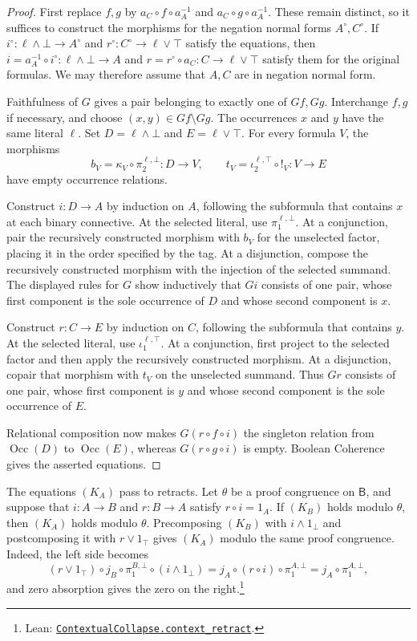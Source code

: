 \documentclass[11pt]{article}
\newcommand{\B}{\mathsf B}
\newcommand{\Occ}{\operatorname{Occ}}
\begin{document}
\begin{proof}
First replace $f,g$ by $a_C\circ f\circ a_A^{-1}$ and
$a_C\circ g\circ a_A^{-1}$. These remain distinct, so it suffices to
construct the morphisms for the negation normal forms $A^\circ,C^\circ$.
If
$i^\circ:\ell\wedge\bot\to A^\circ$ and
$r^\circ:C^\circ\to\ell\vee\top$ satisfy the equations,
then $i=a_A^{-1}\circ i^\circ:\ell\wedge\bot\to A$ and
$r=r^\circ\circ a_C:C\to\ell\vee\top$ satisfy them for the original
formulas.
We may therefore assume that $A,C$ are in negation normal form.

Faithfulness of $G$ gives a pair belonging to exactly one of $Gf,Gg$.
Interchange $f,g$ if necessary, and choose
$(x,y)\in Gf\setminus Gg$. The occurrences $x$ and $y$ have the same
literal $\ell$. Set $D=\ell\wedge\bot$ and $E=\ell\vee\top$.
For every formula $V$, the morphisms
\[
 b_V=\kappa_V\circ\pi_2^{\ell,\bot}:D\to V,
 \qquad
 t_V=\iota_2^{\ell,\top}\circ!_V:V\to E
\]
have empty occurrence relations.

Construct $i:D\to A$ by induction on $A$, following the subformula
that contains $x$ at each binary connective. At the selected literal, use $\pi_1^{\ell,\bot}$.
At a conjunction, pair the recursively constructed morphism with $b_V$
for the unselected factor, placing it in the order specified by the
tag. At a disjunction, compose the recursively constructed morphism
with the injection of the selected summand. The displayed rules for
$G$ show inductively that $Gi$ consists of one pair, whose first component
is the sole occurrence of $D$ and whose second component is $x$.

Construct $r:C\to E$ by induction on $C$, following the subformula
that contains $y$.
At the selected literal, use $\iota_1^{\ell,\top}$.
At a conjunction, first project to the selected factor and then apply
the recursively constructed morphism. At a disjunction, copair that
morphism with $t_V$ on the unselected summand. Thus $Gr$ consists of one pair,
whose first component is $y$ and whose second component is the sole
occurrence of $E$.

Relational composition now makes $G(r\circ f\circ i)$ the singleton
relation from $\Occ(D)$ to $\Occ(E)$, whereas
$G(r\circ g\circ i)$ is empty. Boolean Coherence gives the asserted
equations.
\end{proof}

The equations $(K_A)$ pass to retracts. Let $\theta$ be a proof
congruence on $\B$, and suppose that $i:A\to B$ and $r:B\to A$
satisfy $r\circ i=1_A$. If $(K_B)$ holds modulo $\theta$, then
$(K_A)$ holds modulo $\theta$.
Precomposing $(K_B)$ with $i\wedge1_\bot$ and postcomposing it
with $r\vee1_\top$ gives $(K_A)$ modulo the same proof
congruence. Indeed, the left side becomes
\[
 (r\vee1_\top)\circ j_B\circ\pi_1^{B,\bot}\circ(i\wedge1_\bot)
 =j_A\circ(r\circ i)\circ\pi_1^{A,\bot}
 =j_A\circ\pi_1^{A,\bot},
\]
and zero absorption gives the zero on the right.\footnote{\raggedright Lean:
\href{https://github.com/flengyel/Dosen-Petric-Maximality/blob/dosen-petric-v25-palomar-v3/DosenPetric/Substitution.lean\#L74}{\texttt{ContextualCollapse.\allowbreak{}context\_retract}}.}
\end{document}
